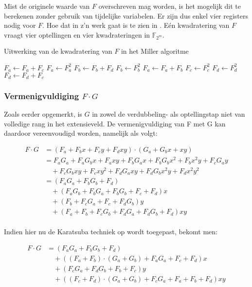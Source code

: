 Mist de originele waarde van $F$ overschreven mag worden, is het mogelijk dit te berekenen zonder gebruik van tijdelijke variabelen. Er zijn dus enkel vier registers nodig voor $F$. Hoe dat in z'n werk gaat is te zien in . E\'en kwadratering van $F$ vraagt vier optellingen en vier kwadrateringen in $\mathbb{F}_{2^m}$.

\begin{algorithm}[h]
	\caption{Uitwerking van de kwadratering van $F$ in het Miller algoritme}
	\label{algoritme-implementatie-miller-f-square}
	$F_a \leftarrow F_a + F_c$\;
	$F_a \leftarrow F_a^2$\;
	$F_b \leftarrow F_b + F_d$\;
	$F_b \leftarrow F_b^2$\;
	$F_a \leftarrow F_a + F_b$\;
	$F_c \leftarrow F_c^2$\;
	$F_d \leftarrow F_d^2$\;
	$F_d \leftarrow F_d + F_c$\;
\end{algorithm}

\subsubsection{Vermenigvuldiging $F \cdot G$}

Zoals eerder opgemerkt, is $G$ in zowel de verdubbeling- als optellingstap niet van volledige rang in het extensieveld. De vermenigvuldiging van F met G kan daardoor vereenvoudigd worden, namelijk als volgt:

\[\begin{aligned}
F \cdot G	&= (F_a + F_b x + F_c y + F_d xy) \cdot (G_a + G_b x + xy)\\
	&= F_a G_a + F_a G_b x + F_a xy + F_b G_a x + F_b G_b x^2 + F_b x^2y + F_c G_a y\\
		&\quad + F_c G_b xy + F_c xy^2 + F_d G_a xy + F_d G_b x^2y + F_d x^2 y^2\\
	&= (F_a G_a + F_b G_b + F_d)\\
		&\quad + (F_a G_b + F_b G_a + F_b G_b + F_c + F_d)x\\
		&\quad + (F_b + F_c G_a + F_c + F_d G_b)y\\
		&\quad + (F_a + F_b + F_c G_b + F_d G_a + F_d G_b + F_d)xy\\
\end{aligned}\]

Indien hier nu de Karatsuba techniek op wordt toegepast, bekomt men:

\[\begin{aligned}
F \cdot G &= (F_a G_a + F_b G_b + F_d)\\
				&\quad + ((F_a + F_b) \cdot (G_a + G_b) + F_a G_a + F_c + F_d)x\\
				&\quad + (F_c G_a + F_d G_b + F_b + F_c)y\\
				&\quad + ((F_c + F_d) \cdot (G_a + G_b) + F_c G_a + F_a + F_b + F_d)xy\\
\end{aligned}\]

